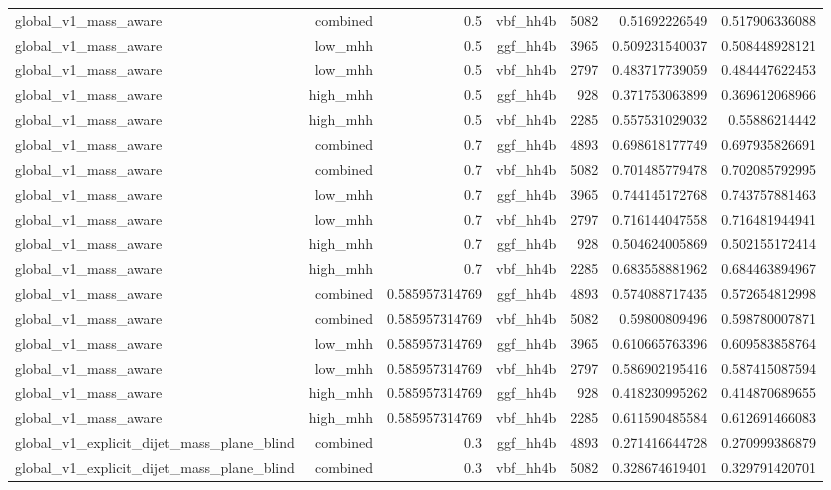 \begin{table}[htbp]
{\begin{tabular}{lrrrrrr}
global\_v1\_mass\_aware & combined & 0.5 & vbf\_hh4b & 5082 & 0.51692226549 & 0.517906336088 \\
global\_v1\_mass\_aware & low\_mhh & 0.5 & ggf\_hh4b & 3965 & 0.509231540037 & 0.508448928121 \\
global\_v1\_mass\_aware & low\_mhh & 0.5 & vbf\_hh4b & 2797 & 0.483717739059 & 0.484447622453 \\
global\_v1\_mass\_aware & high\_mhh & 0.5 & ggf\_hh4b & 928 & 0.371753063899 & 0.369612068966 \\
global\_v1\_mass\_aware & high\_mhh & 0.5 & vbf\_hh4b & 2285 & 0.557531029032 & 0.55886214442 \\
global\_v1\_mass\_aware & combined & 0.7 & ggf\_hh4b & 4893 & 0.698618177749 & 0.697935826691 \\
global\_v1\_mass\_aware & combined & 0.7 & vbf\_hh4b & 5082 & 0.701485779478 & 0.702085792995 \\
global\_v1\_mass\_aware & low\_mhh & 0.7 & ggf\_hh4b & 3965 & 0.744145172768 & 0.743757881463 \\
global\_v1\_mass\_aware & low\_mhh & 0.7 & vbf\_hh4b & 2797 & 0.716144047558 & 0.716481944941 \\
global\_v1\_mass\_aware & high\_mhh & 0.7 & ggf\_hh4b & 928 & 0.504624005869 & 0.502155172414 \\
global\_v1\_mass\_aware & high\_mhh & 0.7 & vbf\_hh4b & 2285 & 0.683558881962 & 0.684463894967 \\
global\_v1\_mass\_aware & combined & 0.585957314769 & ggf\_hh4b & 4893 & 0.574088717435 & 0.572654812998 \\
global\_v1\_mass\_aware & combined & 0.585957314769 & vbf\_hh4b & 5082 & 0.59800809496 & 0.598780007871 \\
global\_v1\_mass\_aware & low\_mhh & 0.585957314769 & ggf\_hh4b & 3965 & 0.610665763396 & 0.609583858764 \\
global\_v1\_mass\_aware & low\_mhh & 0.585957314769 & vbf\_hh4b & 2797 & 0.586902195416 & 0.587415087594 \\
global\_v1\_mass\_aware & high\_mhh & 0.585957314769 & ggf\_hh4b & 928 & 0.418230995262 & 0.414870689655 \\
global\_v1\_mass\_aware & high\_mhh & 0.585957314769 & vbf\_hh4b & 2285 & 0.611590485584 & 0.612691466083 \\
global\_v1\_explicit\_dijet\_mass\_plane\_blind & combined & 0.3 & ggf\_hh4b & 4893 & 0.271416644728 & 0.270999386879 \\
global\_v1\_explicit\_dijet\_mass\_plane\_blind & combined & 0.3 & vbf\_hh4b & 5082 & 0.328674619401 & 0.329791420701 \\

\end{tabular}}
\end{table}
